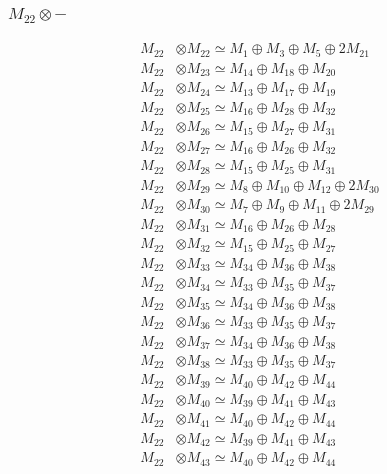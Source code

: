 \subsubsection{$ M_{22}\otimes -$}
\begin{align*}
M_{22} &\otimes M_{22} \simeq M_{1} \oplus M_{3} \oplus M_{5} \oplus 2M_{21} \\
M_{22} &\otimes M_{23} \simeq M_{14} \oplus M_{18} \oplus M_{20} \\
M_{22} &\otimes M_{24} \simeq M_{13} \oplus M_{17} \oplus M_{19} \\
M_{22} &\otimes M_{25} \simeq M_{16} \oplus M_{28} \oplus M_{32} \\
M_{22} &\otimes M_{26} \simeq M_{15} \oplus M_{27} \oplus M_{31} \\
M_{22} &\otimes M_{27} \simeq M_{16} \oplus M_{26} \oplus M_{32} \\
M_{22} &\otimes M_{28} \simeq M_{15} \oplus M_{25} \oplus M_{31} \\
M_{22} &\otimes M_{29} \simeq M_{8} \oplus M_{10} \oplus M_{12} \oplus 2M_{30} \\
M_{22} &\otimes M_{30} \simeq M_{7} \oplus M_{9} \oplus M_{11} \oplus 2M_{29} \\
M_{22} &\otimes M_{31} \simeq M_{16} \oplus M_{26} \oplus M_{28} \\
M_{22} &\otimes M_{32} \simeq M_{15} \oplus M_{25} \oplus M_{27} \\
M_{22} &\otimes M_{33} \simeq M_{34} \oplus M_{36} \oplus M_{38} \\
M_{22} &\otimes M_{34} \simeq M_{33} \oplus M_{35} \oplus M_{37} \\
M_{22} &\otimes M_{35} \simeq M_{34} \oplus M_{36} \oplus M_{38} \\
M_{22} &\otimes M_{36} \simeq M_{33} \oplus M_{35} \oplus M_{37} \\
M_{22} &\otimes M_{37} \simeq M_{34} \oplus M_{36} \oplus M_{38} \\
M_{22} &\otimes M_{38} \simeq M_{33} \oplus M_{35} \oplus M_{37} \\
M_{22} &\otimes M_{39} \simeq M_{40} \oplus M_{42} \oplus M_{44} \\
M_{22} &\otimes M_{40} \simeq M_{39} \oplus M_{41} \oplus M_{43} \\
M_{22} &\otimes M_{41} \simeq M_{40} \oplus M_{42} \oplus M_{44} \\
M_{22} &\otimes M_{42} \simeq M_{39} \oplus M_{41} \oplus M_{43} \\
M_{22} &\otimes M_{43} \simeq M_{40} \oplus M_{42} \oplus M_{44} \\

\end{align*}
